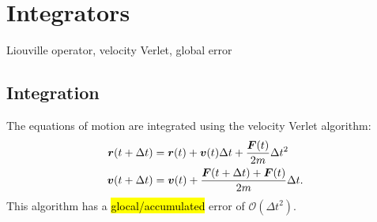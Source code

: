 \chapter{Integrators}
Liouville operator, velocity Verlet, global error


\section{Integration}



The equations of motion are integrated using the velocity Verlet algorithm:
\begin{align*}
    \boldsymbol{r}(t + \Delta t) &= \boldsymbol{r}(t) + \boldsymbol{v}(t)\Delta t + \frac{\boldsymbol{F}(t)}{2m}\Delta t^2 \\
    \boldsymbol{v}(t + \Delta t) &= \boldsymbol{v}(t) + \frac{\boldsymbol{F}(t + \Delta t) + \boldsymbol{F}(t)}{2m}\Delta t.
\end{align*}
This algorithm has a \hl{glocal/accumulated} error of $\mathcal{O}(\Delta t^2)$.

